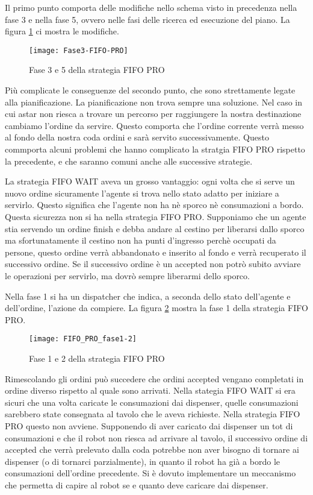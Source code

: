 Il primo punto comporta delle modifiche nello schema visto in precedenza nella fase 3 e nella fase 5, ovvero nelle fasi delle ricerca ed esecuzione del piano. La figura \ref{fig:figure3} ci mostra le modifiche.

\begin{figure}[htp]
  \texttt{[image: Fase3-FIFO-PRO]}
  \caption{Fase 3 e 5 della strategia FIFO PRO}
  \label{fig:figure3}
\end{figure}

Più complicate le conseguenze del secondo punto, che sono strettamente legate alla pianificazione. La pianificazione non trova sempre una soluzione. Nel caso in cui astar non riesca a trovare un percorso per raggiungere la nostra destinazione cambiamo l'ordine da servire. Questo comporta che l'ordine corrente verrà messo al fondo della nostra coda ordini e sarà servito successivamente. Questo commporta alcuni problemi che hanno complicato la stratgia FIFO PRO rispetto la precedente, e che saranno comuni anche alle successive strategie.

La strategia FIFO WAIT aveva un grosso vantaggio: ogni volta che si serve un nuovo ordine sicuramente l'agente si trova nello stato adatto per iniziare a servirlo.
Questo significa che l'agente non ha nè sporco nè consumazioni a bordo. Questa sicurezza non si ha nella strategia FIFO PRO. Supponiamo che un agente stia servendo un ordine finish e debba andare al cestino per liberarsi dallo sporco ma sfortunatamente il cestino non ha punti d'ingresso perchè occupati da persone, questo ordine verrà abbandonato e inserito al fondo e verrà recuperato il successivo ordine. Se il successivo ordine è un accepted non potrò subito avviare le operazioni per servirlo, ma dovrò sempre liberarmi dello sporco.

Nella fase 1 si ha un dispatcher che indica, a seconda dello stato dell'agente e dell'ordine, l'azione da compiere. La figura \ref{fig:figure4} mostra la fase 1 della strategia FIFO PRO.

\begin{figure}[htp]
  \texttt{[image: FIFO\_PRO\_fase1-2]}
  \caption{Fase 1 e 2 della strategia FIFO PRO}
  \label{fig:figure4}
\end{figure}

Rimescolando gli ordini può succedere che ordini accepted vengano completati in ordine diverso rispetto al quale sono arrivati. Nella stategia FIFO WAIT si era sicuri che una volta caricate le consumazioni dai dispenser, quelle consumazioni sarebbero state consegnata al tavolo che le aveva richieste. Nella strategia FIFO PRO questo non avviene. Supponendo di aver caricato dai dispenser un tot di consumazioni e che il robot non riesca ad arrivare al tavolo, il successivo ordine di accepted che verrà prelevato dalla coda potrebbe non aver bisogno di tornare ai dispenser (o di tornarci parzialmente), in quanto il robot ha già a bordo le consumazioni dell'ordine precedente. Si è dovuto implementare un meccanismo che permetta di capire al robot se e quanto deve caricare dai dispenser.

